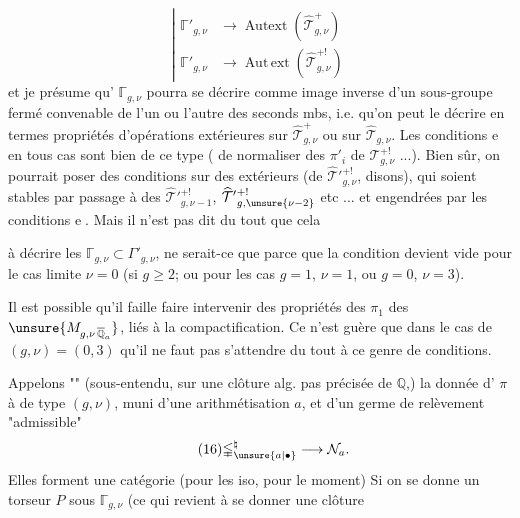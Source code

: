 \[
\tag{15}
\left|
\begin{aligned}
\mathbb{\Gamma}'_{g,\nu}&\longrightarrow\operatorname{Autext}(\widehat{\mathcal T}_{g,\nu}^{+})\\
\mathbb{\Gamma}'_{g,\nu}&\longrightarrow\operatorname{Aut\,ext}(\widehat{\mathcal T}_{g,\nu}^{+!})
\end{aligned}
\right.
\]
et je présume qu' $\mathbb{\Gamma}_{g,\nu}$ pourra
se décrire comme image inverse d'un
sous-groupe fermé convenable de l'un
ou l'autre des seconds mbs, i.e. qu'on
peut le décrire en termes  propriétés
d'opérations extérieures sur $\widehat{\mathcal T}_{g,\nu}^{+}$ ou
sur $\widehat{\mathcal T}_{g,\nu}$. Les conditions \textcircled{e} en tous
cas sont bien de ce type (
de normaliser des  
 $\pi'_i$ de $\mathcal T_{g,\nu}^{+!}$ ...).
Bien sûr, on
pourrait poser des conditions sur des
 extérieurs (de $\widehat{\mathcal T}'{}_{g,\nu}^{+!}$, disons),
qui soient stables par passage  à des
$\widehat{\mathcal T}'{}_{g,\nu-1}^{+!}$, $\widehat{\mathcal T}'{}_{g,\unsure{\nu-2}}^{+!}$ etc ... et
engendrées par les conditions \textcircled{e}. Mais
il n'est pas dit du tout que cela



 à décrire les 
$\mathbb{\Gamma}_{g,\nu}\subset\Gamma'_{g,\nu}$,
ne serait-ce que parce que la condition
devient vide pour  le cas limite $\nu=0$
(si $g\geq2$; ou pour les cas $g=1$, $\nu=1$, ou $g=0$, $\nu=3$).

Il est possible qu'il faille faire
intervenir des propriétés des $\pi_1$ des
$\unsure{M_{g,\nu\,\overline{\mathbb Q}_a}}$, liés à la compactification.
Ce n'est guère que dans le cas de
$(g,\nu)=(0,3)$ qu'il ne faut pas s'attendre
du tout à ce genre de conditions.

Appelons ""
(sous-entendu, sur une clôture alg. pas précisée de $\mathbb Q$,)
la donnée d' 
$\pi$ à  
de type $(g,\nu)$, muni d'une arithmétisation
$a$, et d'un germe de relèvement
"admissible"
\[
\tag{16}
\mathbb{\Gamma}_{\unsure{a|\bullet}}^{\natural}
\longrightarrow\mathcal N_a.
\]
Elles forment une catégorie (pour les
iso, pour le moment) Si on se
donne un torseur $P$ sous $\mathbb{\Gamma}_{g,\nu}$
(ce qui  revient à se donner une clôture

